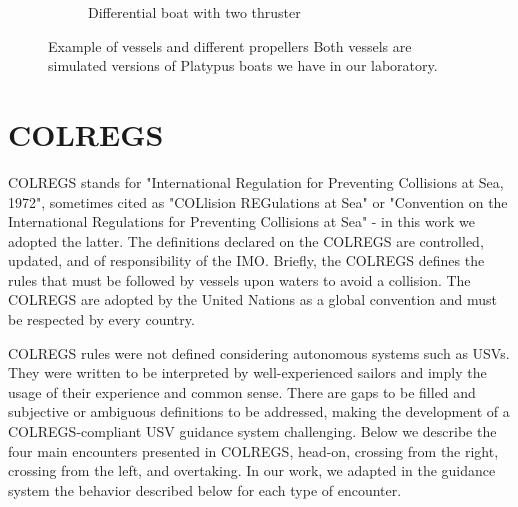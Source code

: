 \begin{figure}[H]
\begin{subfigure}[b]{0.52\textwidth}
            \caption{Differential boat with two thruster}
            \label{fig:chap2_diffboat}
        \end{subfigure}
    
    \caption{Example of vessels and different propellers Both vessels are simulated versions of Platypus\cite{PlatypusLLC} boats we have in our laboratory.}
    \label{fig:boats}
    \end{figure}

\section{COLREGS}
\label{sec:colregs}


    \ac{COLREGS}\cite{COLREGS} stands for "International Regulation for Preventing Collisions at Sea, 1972", sometimes cited as "COLlision REGulations at Sea" or "Convention on the International Regulations for Preventing Collisions at Sea" - in this work we adopted the latter. The definitions declared on the \ac{COLREGS} are controlled, updated, and of responsibility of the \ac{IMO}. Briefly, the \ac{COLREGS} defines the rules that must be followed by vessels upon waters to avoid a collision. 
    The \ac{COLREGS} are adopted by the United Nations as a global convention and must be respected by every country.
    
    
    \ac{COLREGS} rules were not defined considering autonomous systems such as \ac{USV}s. They were written to be interpreted by well-experienced sailors and imply the usage of their experience and common sense. There are gaps to be filled and subjective or ambiguous definitions to be addressed, making the development of a \ac{COLREGS}-compliant \ac{USV} guidance system challenging.
    Below we describe the four main encounters presented in \ac{COLREGS}, head-on, crossing from the right, crossing from the left, and overtaking. In our work, we adapted in the guidance system the behavior described below for each type of encounter.
    
